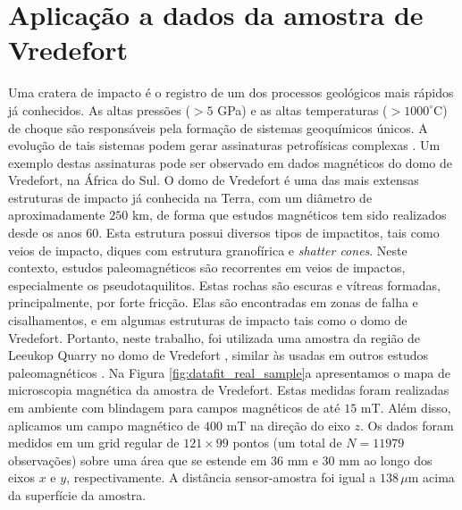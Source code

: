 \chapter{Aplicação a dados da amostra de Vredefort}
\label{sec:lab_application}

Uma cratera de impacto é o registro de um dos processos geológicos mais rápidos já conhecidos. As altas pressões ($> 5$ GPa) e as altas temperaturas ($> 1000^\circ$C) de choque são responsáveis pela formação de sistemas geoquímicos únicos. A evolução de tais sistemas podem gerar assinaturas petrofísicas complexas \citep{pilkington_grieve_1992,pilkington_hildebrand_2003,yokoyama_etal_2015}. Um exemplo destas assinaturas pode ser observado em dados magnéticos do domo de Vredefort, na África do Sul. O domo de Vredefort é uma das mais extensas estruturas de impacto já conhecida na Terra, com um diâmetro de aproximadamente $250$ km, de forma que estudos magnéticos tem sido realizados desde os anos 60. Esta estrutura possui diversos tipos de impactitos, tais como veios de impacto, diques com estrutura granofírica e \textit{shatter cones}. Neste contexto, estudos paleomagnéticos são recorrentes em veios de impactos, especialmente os pseudotaquilitos. Estas rochas são escuras e vítreas formadas, principalmente, por forte fricção. Elas são encontradas em zonas de falha e cisalhamentos, e em algumas estruturas de impacto tais como o domo de Vredefort. Portanto, neste trabalho, foi utilizada uma amostra da região de Leeukop Quarry no domo de Vredefort \citep{araujo_etal2019_materials}, similar às usadas em outros estudos paleomagnéticos \citep{passchier_1982,lana_etal_2003,dressler_reimold_2004,carporzen_etal_2005,araujo_etal2019_sensors}. Na Figura \ref{fig:datafit_real_sample}a apresentamos o mapa de microscopia magnética da amostra de Vredefort. Estas medidas foram realizadas em ambiente com blindagem para campos magnéticos de até $15$ mT. Além disso, aplicamos um campo magnético de $400$ mT na direção do eixo $z$. Os dados foram medidos em um grid regular de $121 \times 99$ pontos (um total de $N=11979$ observações) sobre uma área que se estende em $36$ mm e $30$ mm ao longo dos eixos $x$ e $y$, respectivamente. A distância sensor-amostra foi igual a $138 \, \mu$m acima da superfície da amostra. 


